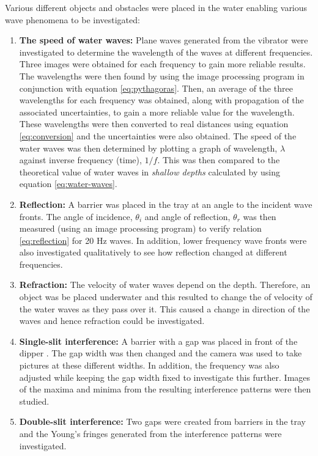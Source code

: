 \documentclass{article}
\begin{document}
\vspace{2mm}
\noindent
Various different objects and obstacles were placed in the water enabling various wave phenomena to be investigated:

\begin{enumerate}
  \item \textbf{The speed of water waves:} Plane waves generated from the vibrator were investigated to determine the wavelength of the waves at different frequencies. Three images were obtained for each frequency to gain more reliable results. The wavelengths were then found by using the image processing program in conjunction with equation \eqref{eq:pythagoras}. Then, an average of the three wavelengths for each frequency was obtained, along with propagation of the associated uncertainties, to gain a more reliable value for the wavelength. These wavelengths were then converted to real distances using equation \eqref{eq:conversion} and the uncertainties were also obtained. The speed of the water waves was then determined by plotting a graph of wavelength, $\lambda$ against inverse frequency (time), $1/f$. This was then compared to the theoretical value of water waves in \textit{shallow depths} calculated by using equation \eqref{eq:water-waves}. 
  \item \textbf{Reflection:} A barrier was placed in the tray at an angle to the incident wave fronts. The angle of incidence, $\theta_i$ and angle of reflection, $\theta_r$ was then measured (using an image processing program) to verify relation \eqref{eq:reflection} for 20 Hz waves. In addition, lower frequency wave fronts were also investigated qualitatively to see how reflection changed at different frequencies.
  \item \textbf{Refraction:} The velocity of water waves depend on the depth. Therefore, an object was be placed underwater and this resulted to change the of velocity of the water waves as they pass over it. This caused a change in direction of the waves and hence refraction could be investigated.
  \item \textbf{Single-slit interference:} A barrier with a gap was placed in front of the dipper \cite{Paper01}. The gap width was then changed and the camera was used to take pictures at these different widths. In addition, the frequency was also adjusted while keeping the gap width fixed to investigate this further. Images of the maxima and minima from the resulting interference patterns were then studied.
  \item \textbf{Double-slit interference:} Two gaps were created from barriers in the tray and the Young's fringes generated from the interference patterns were investigated. 

\end{enumerate}
\end{document}
